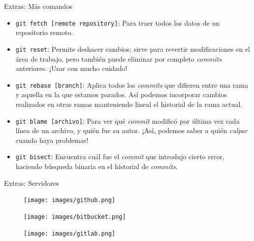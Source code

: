 \begin{frame}[t]{Extras: Más comandos}

    \begin{itemize}
        \item \texttt{git fetch [remote repository]}: Para traer todos los datos de un repositorio remoto.
        \item \texttt{git reset}: Permite deshacer cambios; sirve para revertir modificaciones en el área de trabajo, pero también puede eliminar por completo \textit{commits} anteriores. ¡Usar con mucho cuidado!
        \item \texttt{git rebase [branch]}: Aplica todos los \textit{commits} que difieren entre una rama y aquella en la que estamos parados. Así podemos incorporar cambios realizados en otras ramas manteniendo lineal el historial de la rama actual.
        \item \texttt{git blame [archivo]}: Para ver qué \textit{commit} modificó por última vez cada línea de un archivo, y quién fue su autor. ¡Así, podemos saber a quién \textit{culpar} cuando haya problemas!
        \item \texttt{git bisect}: Encuentra cuál fue el \textit{commit} que introdujo cierto error, haciendo búsqueda binaria en el historial de \textit{commits}.
    \end{itemize}

\end{frame}

\begin{frame}[t]{Extras: Servidores}

    \begin{figure}[ht]
        \begin{center}
            \texttt{[image: images/github.png]}
        \end{center}
    \end{figure}

    \begin{figure}[ht]
        \begin{center}
            \texttt{[image: images/bitbucket.png]}
        \end{center}
    \end{figure}

    \begin{figure}[ht]
        \begin{center}
            \texttt{[image: images/gitlab.png]}
        \end{center}
    \end{figure}

\end{frame}

